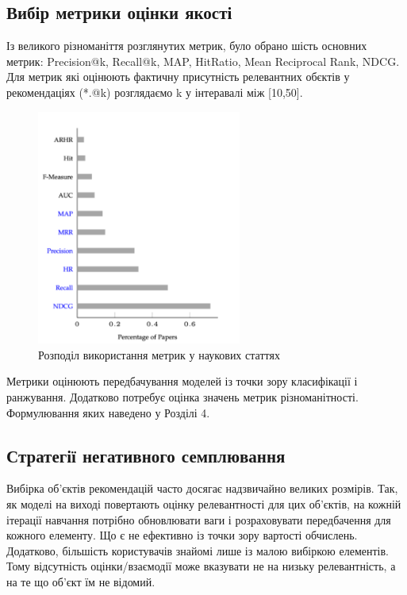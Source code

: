 \subsection{Вибір метрики оцінки якості}
Із великого різноманіття розглянутих метрик, було обрано шість основних метрик: Precision@k, Recall@k, MAP, HitRatio,  Mean Reciprocal Rank, NDCG. 
Для метрик які оцінюють фактичну присутність релевантних обєктів у рекомендаціях (*.@k) розглядаємо k у інтеравалі між [10,50].
\begin{figure}[H]
    \centering
    \includegraphics[width=0.6\textwidth]{images/metric_hist_papers.png}
    \caption{Розподіл використання метрик у наукових статтях}
\end{figure}

Метрики оцінюють передбачування моделей із точки зору класифікації і ранжування. Додатково потребує оцінка значень метрик різноманітності. Формулювання яких наведено у Розділі 4. 

\subsection{Стратегії негативного семплювання}
Вибірка об’єктів рекомендацій часто досягає надзвичайно великих розмірів.
Так, як моделі на виході повертають оцінку релевантності для цих об’єктів, на 
кожній ітерації навчання потрібно обновлювати ваги і розраховувати передбачення для кожного елементу. Що є не ефективно із точки зору вартості обчислень. Додатково, більшість користувачів знайомі лише із малою вибіркою елементів. Тому відсутність оцінки/взаємодії може вказувати не на низьку релевантність, а на те що об’єкт їм не відомий.

